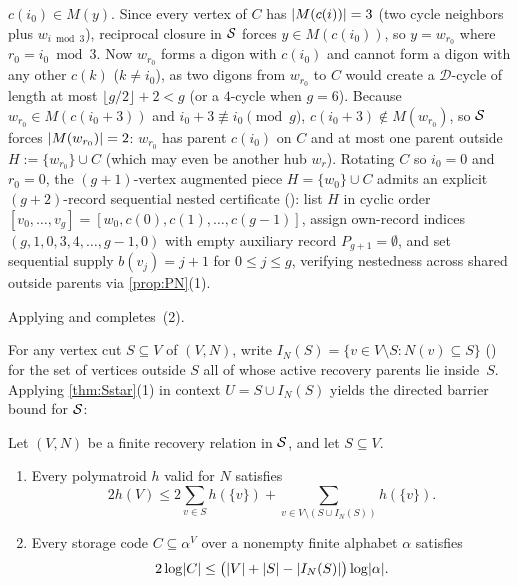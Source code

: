 \begin{outline}
\begin{enumerate}
\begin{itemize}
    $c(i_0) \in M(y)$. Since every vertex of $C$ has $\lvert M(c(i)) \rvert = 3$ (two cycle neighbors plus $w_{i \bmod 3}$),
    reciprocal closure in $\mathcal{S}$ forces $y \in M(c(i_0))$, so $y = w_{r_0}$ where $r_0 = i_0 \bmod 3$. Now $w_{r_0}$
    forms a digon with $c(i_0)$ and cannot form a digon with any other $c(k)$ ($k \ne i_0$), as two digons from $w_{r_0}$
    to $C$ would create a $\mathcal{D}$-cycle of length at most $\lfloor g/2 \rfloor + 2 < g$ (or a $4$-cycle when $g = 6$).
    Because $w_{r_0} \in M(c(i_0 + 3))$ and $i_0 + 3 \not\equiv i_0 \pmod g$, $c(i_0 + 3) \notin M(w_{r_0})$, so $\mathcal{S}$
    forces $\lvert M(w_{r_0}) \rvert = 2$: $w_{r_0}$ has parent $c(i_0)$ on $C$ and at most one parent outside $H := \{w_{r_0}\}
    \cup C$ (which may even be another hub $w_r$). Rotating $C$ so $i_0 = 0$ and $r_0 = 0$, the $(g+1)$-vertex augmented
    piece $H = \{w_0\} \cup C$ admits an explicit $(g+2)$-record sequential nested certificate
    (): list $H$ in cyclic order $[v_0, \dots, v_g] = [w_0, c(0), c(1), \dots, c(g-1)]$,
    assign own-record indices $(g, 1, 0, 3, 4, \dots, g-1, 0)$ with empty auxiliary record $P_{g+1} = \emptyset$, and set
    sequential supply $b(v_j) = j + 1$ for $0 \le j \le g$, verifying nestedness across shared outside parents via
    \cref{prop:PN}(1).
  \end{itemize}
\end{enumerate}
Applying  and  completes~(2).
\end{outline}

For any vertex cut $S \subseteq V$ of $(V, N)$, write $I_N(S) = \{v \in V \setminus S : N(v) \subseteq S\}$
() for the set of vertices outside $S$ all of whose active recovery parents lie inside~$S$. Applying
\cref{thm:Sstar}(1) in context $U = S \cup I_N(S)$ yields the directed barrier bound for $\mathcal{S}$:

\begin{corollary}\label{cor:Bstar}
Let $(V, N)$ be a finite recovery relation in $\mathcal{S}$, and let $S \subseteq V$.
\begin{enumerate}
\item Every polymatroid $h$ valid for $N$ satisfies
  \[
    2 h(V) \le 2 \sum_{v \in S} h(\{v\}) + \sum_{v \in V \setminus (S \cup I_N(S))} h(\{v\}).
  \]
\item Every storage code $C \subseteq \alpha^V$ over a nonempty finite alphabet $\alpha$ satisfies
  \[
    2 \log \lvert C \rvert \le \bigl(\lvert V \rvert + \lvert S \rvert - \lvert I_N(S) \rvert\bigr) \log \lvert \alpha \rvert.
  \]
\end{enumerate}
\end{corollary}


